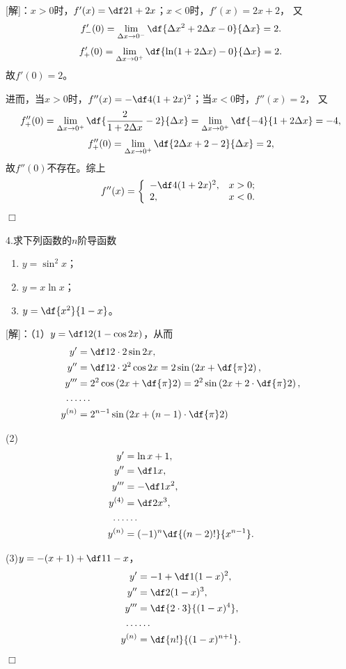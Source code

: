 [解]：$x>0$时，$f'(x)=\df2{1+2x}$；$x<0$时，$f'(x)=2x+2$，
又
$$f'_-(0)=\lim\limits_{\Delta x\to0^-}\df{\Delta x^2+2\Delta x-0}{\Delta x}=2.$$
$$f'_+(0)=\lim\limits_{\Delta x\to0^+}\df{\ln(1+2\Delta x)-0}{\Delta x}=2.$$
故$f'(0)=2$。

进而，当$x>0$时，$f''(x)=-\df4{(1+2x)^2}$；当$x<0$时，$f''(x)=2$，
又
$$f''_+(0)=\lim\limits_{\Delta x\to0^+}
\df{\frac2{1+2\Delta x}-2}{\Delta x}
=\lim\limits_{\Delta x\to0^+}
\df{-4}{1+2\Delta x}=-4,$$
$$f''_+(0)=\lim\limits_{\Delta x\to0^+}
\df{2\Delta x+2-2}{\Delta x}=2,
$$
故$f''(0)$不存在。综上
$$f''(x)=\left\{\begin{array}{ll}
	-\df4{(1+2x)^2}, & x>0;\\
	2, & x<0.
\end{array}\right.$$
\hfill$\Box$

\bigskip

4.求下列函数的$n$阶导函数
  \begin{enumerate}[(1)]
    \setlength{\itemindent}{1cm}
    \item $y=\sin^2x$；
    \item $y=x\ln x$；
    \item $y=\df{x^2}{1-x}$。
  \end{enumerate}
  
[解]：（1）$y=\df12(1-\cos2x)$，从而
\begin{align*}
	y'&=\df12\cdot 2\sin2x,\\
	y''&=\df12\cdot 2^2\cos2x=2\sin\left(2x+\df{\pi}2\right),\\
	y'''&=2^2\cos\left(2x+\df{\pi}2\right)=2^2\sin\left(2x+2\cdot\df{\pi}2\right),\\
	\ldots&\ldots\\
	y^{(n)}&=2^{n-1}\sin\left(2x+(n-1)\cdot\df{\pi}2\right)
\end{align*}

(2)
\begin{align*}
	y'&=\ln x+1,\\
	y''&=\df1x,\\
	y'''&=-\df1{x^2},\\
	y^{(4)}&=\df2{x^3},\\
	\ldots&\ldots\\
	y^{(n)}&=(-1)^n\df{(n-2)!}{x^{n-1}}.
\end{align*}

(3)$y=-(x+1)+\df1{1-x}$，
\begin{align*}
	y'&=-1+\df1{(1-x)^2},\\
	y''&=\df2{(1-x)^3},\\
	y'''&=\df{2\cdot 3}{(1-x)^4},\\
	\ldots&\ldots\\
	y^{(n)}&=\df{n!}{(1-x)^{n+1}}.
\end{align*}
\hfill$\Box$

